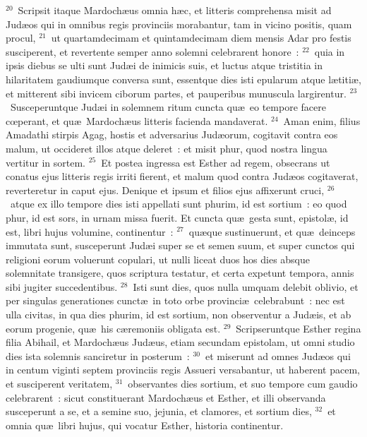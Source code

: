 ${}^{20}$~Scripsit itaque Mardoch\ae us omnia h\ae c, et litteris comprehensa misit ad Jud\ae os qui in omnibus regis provinciis morabantur, tam in vicino positis, quam procul,
${}^{21}$~ut quartamdecimam et quintamdecimam diem mensis Adar pro festis susciperent, et revertente semper anno solemni celebrarent honore~:
${}^{22}$~quia in ipsis diebus se ulti sunt Jud\ae i de inimicis suis, et luctus atque tristitia in hilaritatem gaudiumque conversa sunt, essentque dies isti epularum atque l\ae titi\ae , et mitterent sibi invicem ciborum partes, et pauperibus munuscula largirentur.
${}^{23}$~Susceperuntque Jud\ae i in solemnem ritum cuncta qu\ae\ eo tempore facere cœperant, et qu\ae\ Mardoch\ae us litteris facienda mandaverat.
${}^{24}$~Aman enim, filius Amadathi stirpis Agag, hostis et adversarius Jud\ae orum, cogitavit contra eos malum, ut occideret illos atque deleret~: et misit phur, quod nostra lingua vertitur in sortem.
${}^{25}$~Et postea ingressa est Esther ad regem, obsecrans ut conatus ejus litteris regis irriti fierent, et malum quod contra Jud\ae os cogitaverat, reverteretur in caput ejus. Denique et ipsum et filios ejus affixerunt cruci,
${}^{26}$~atque ex illo tempore dies isti appellati sunt phurim, id est sortium~: eo quod phur, id est sors, in urnam missa fuerit. Et cuncta qu\ae\ gesta sunt, epistol\ae , id est, libri hujus volumine, continentur~:
${}^{27}$~qu\ae que sustinuerunt, et qu\ae\ deinceps immutata sunt, susceperunt Jud\ae i super se et semen suum, et super cunctos qui religioni eorum voluerunt copulari, ut nulli liceat duos hos dies absque solemnitate transigere, quos scriptura testatur, et certa expetunt tempora, annis sibi jugiter succedentibus.
${}^{28}$~Isti sunt dies, quos nulla umquam delebit oblivio, et per singulas generationes cunct\ae\ in toto orbe provinci\ae\ celebrabunt~: nec est ulla civitas, in qua dies phurim, id est sortium, non observentur a Jud\ae is, et ab eorum progenie, qu\ae\ his c\ae remoniis obligata est.
${}^{29}$~Scripseruntque Esther regina filia Abihail, et Mardoch\ae us Jud\ae us, etiam secundam epistolam, ut omni studio dies ista solemnis sanciretur in posterum~:
${}^{30}$~et miserunt ad omnes Jud\ae os qui in centum viginti septem provinciis regis Assueri versabantur, ut haberent pacem, et susciperent veritatem,
${}^{31}$~observantes dies sortium, et suo tempore cum gaudio celebrarent~: sicut constituerant Mardoch\ae us et Esther, et illi observanda susceperunt a se, et a semine suo, jejunia, et clamores, et sortium dies,
${}^{32}$~et omnia qu\ae\ libri hujus, qui vocatur Esther, historia continentur.

